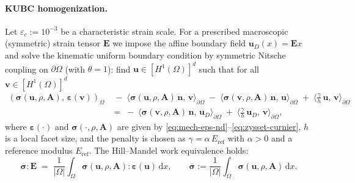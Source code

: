\paragraph{KUBC homogenization.}
Let $\varepsilon_c:=10^{-3}$ be a characteristic strain scale. For a prescribed macroscopic (symmetric) strain tensor $\mathbf{E}$ we impose the affine boundary field $\mathbf{u}_D(x)=\mathbf{E}x$ and solve the kinematic uniform boundary condition by symmetric Nitsche coupling on $\partial\Omega$ (with $\theta=1$): find $\mathbf{u}\in[H^1(\Omega)]^d$ such that for all $\mathbf{v}\in[H^1(\Omega)]^d$
\begin{equation}\label{eq:kubc-nitsche-weak}
\begin{aligned}
(\boldsymbol{\sigma}(\mathbf{u},\rho,\mathbf{A}),\,\boldsymbol{\varepsilon}(\mathbf{v}))_{\Omega}
&\;-\;\langle \boldsymbol{\sigma}(\mathbf{u},\rho,\mathbf{A})\,\mathbf{n},\,\mathbf{v}\rangle_{\partial\Omega}
\;-\;\langle \boldsymbol{\sigma}(\mathbf{v},\rho,\mathbf{A})\,\mathbf{n},\,\mathbf{u}\rangle_{\partial\Omega}
\;+\;\Big\langle \frac{\gamma}{h}\,\mathbf{u},\,\mathbf{v}\Big\rangle_{\partial\Omega}
\\
&=\;-\;\langle \boldsymbol{\sigma}(\mathbf{v},\rho,\mathbf{A})\,\mathbf{n},\,\mathbf{u}_D\rangle_{\partial\Omega}
\;+\;\Big\langle \frac{\gamma}{h}\,\mathbf{u}_D,\,\mathbf{v}\Big\rangle_{\partial\Omega},
\end{aligned}
\end{equation}
where $\boldsymbol{\varepsilon}(\cdot)$ and $\boldsymbol{\sigma}(\cdot,\rho,\mathbf{A})$ are given by \eqref{eq:mech-eps-nd}--\eqref{eq:zysset-curnier}, $h$ is a local facet size, and the penalty is chosen as $\gamma=\alpha\,E_{\mathrm{ref}}$ with $\alpha>0$ and a reference modulus $E_{\mathrm{ref}}$. The Hill–Mandel work equivalence holds:
\begin{equation}\label{eq:hill-mandel-nd}
\overline{\boldsymbol{\sigma}}:\mathbf{E}
\;=\;\frac{1}{|\Omega|}\int_{\Omega}\boldsymbol{\sigma}(\mathbf{u},\rho,\mathbf{A}):\boldsymbol{\varepsilon}(\mathbf{u})\,\mathrm{d}x,
\qquad
\overline{\boldsymbol{\sigma}}:=\frac{1}{|\Omega|}\int_{\Omega}\boldsymbol{\sigma}(\mathbf{u},\rho,\mathbf{A})\,\mathrm{d}x.
\end{equation}

